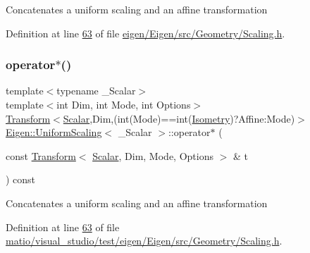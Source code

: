Concatenates a uniform scaling and an affine transformation 

Definition at line \hyperlink{eigen_2_eigen_2src_2_geometry_2_scaling_8h_source_l00063}{63} of file \hyperlink{eigen_2_eigen_2src_2_geometry_2_scaling_8h_source}{eigen/\+Eigen/src/\+Geometry/\+Scaling.\+h}.

\mbox{\label{class_eigen_1_1_uniform_scaling_a0fc239af586bb24d7db99c6b8ce42373}} 
\subsubsection{\texorpdfstring{operator$\ast$()}{operator*()}\hspace{0.1cm}{\footnotesize\ttfamily [6/8]}}
{\footnotesize\ttfamily template$<$typename \+\_\+\+Scalar$>$ \\
template$<$int Dim, int Mode, int Options$>$ \\
\hyperlink{group___geometry___module_class_eigen_1_1_transform}{Transform}$<$\hyperlink{class_eigen_1_1_uniform_scaling_a04c4339f58f1210c5d4d34b1bd7ae283}{Scalar},Dim,(int(Mode)==int(\hyperlink{group__enums_ggaee59a86102f150923b0cac6d4ff05107a080cd5366173608f701cd945c2335568}{Isometry})?Affine\+:\+Mode)$>$ \hyperlink{class_eigen_1_1_uniform_scaling}{Eigen\+::\+Uniform\+Scaling}$<$ \+\_\+\+Scalar $>$\+::operator$\ast$ (\begin{DoxyParamCaption}\item[{const \hyperlink{group___geometry___module_class_eigen_1_1_transform}{Transform}$<$ \hyperlink{class_eigen_1_1_uniform_scaling_a04c4339f58f1210c5d4d34b1bd7ae283}{Scalar}, Dim, Mode, Options $>$ \&}]{t }\end{DoxyParamCaption}) const\hspace{0.3cm}{\ttfamily [inline]}}

Concatenates a uniform scaling and an affine transformation 

Definition at line \hyperlink{matio_2visual__studio_2test_2eigen_2_eigen_2src_2_geometry_2_scaling_8h_source_l00063}{63} of file \hyperlink{matio_2visual__studio_2test_2eigen_2_eigen_2src_2_geometry_2_scaling_8h_source}{matio/visual\+\_\+studio/test/eigen/\+Eigen/src/\+Geometry/\+Scaling.\+h}.

\mbox{\label{class_eigen_1_1_uniform_scaling_a1caa980503c4bba685aa65b419cad64b}} 
